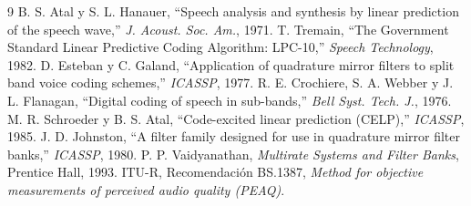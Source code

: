 \documentclass[10pt,twocolumn]{article}
\begin{document}
\begin{thebibliography}{9}\small
{} B. S. Atal y S. L. Hanauer, ``Speech analysis and synthesis by linear prediction of the speech wave,'' \emph{J. Acoust. Soc. Am.}, 1971.
 T. Tremain, ``The Government Standard Linear Predictive Coding Algorithm: LPC-10,'' \emph{Speech Technology}, 1982.
 D. Esteban y C. Galand, ``Application of quadrature mirror filters to split band voice coding schemes,'' \emph{ICASSP}, 1977.
 R. E. Crochiere, S. A. Webber y J. L. Flanagan, ``Digital coding of speech in sub-bands,'' \emph{Bell Syst. Tech. J.}, 1976.
 M. R. Schroeder y B. S. Atal, ``Code-excited linear prediction (CELP),'' \emph{ICASSP}, 1985.
 J. D. Johnston, ``A filter family designed for use in quadrature mirror filter banks,'' \emph{ICASSP}, 1980.
 P. P. Vaidyanathan, \emph{Multirate Systems and Filter Banks}, Prentice Hall, 1993.
 ITU-R, Recomendaci\'on BS.1387, \emph{Method for objective measurements of perceived audio quality (PEAQ)}.
\end{thebibliography}
\end{document}
